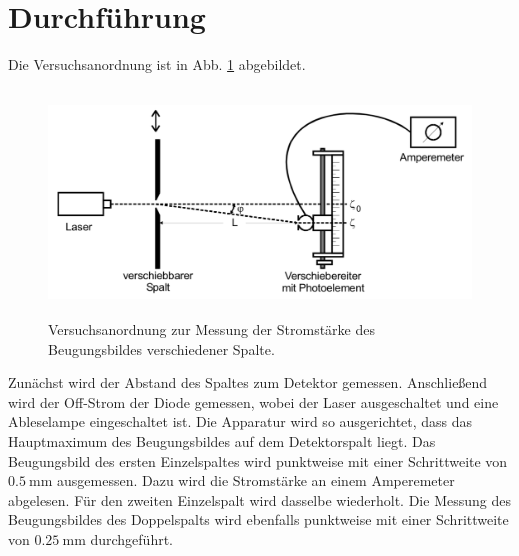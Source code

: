 \section{Durchführung}
\label{sec:Durchführung}
Die Versuchsanordnung ist in Abb. \ref{fig:Anordnung} abgebildet.
\begin{figure}
    \centering
    \includegraphics[width=12cm, height=6cm]{build/Anordnung.png}
    \caption{Versuchsanordnung zur Messung der Stromstärke des
    Beugungsbildes verschiedener Spalte. \cite{V406}}
    \label{fig:Anordnung}
\end{figure}

\noindent Zunächst wird der Abstand des Spaltes zum Detektor gemessen.
Anschließend wird der Off-Strom der Diode gemessen, wobei
der Laser ausgeschaltet und eine Ableselampe eingeschaltet ist.
\newline
Die Apparatur wird so ausgerichtet, dass das Hauptmaximum des 
Beugungsbildes auf dem Detektorspalt liegt.
\newline
Das Beugungsbild des ersten Einzelspaltes wird punktweise
mit einer Schrittweite von $\SI{0.5}{\milli\meter}$ ausgemessen.
Dazu wird die Stromstärke an einem Amperemeter abgelesen.
\newline
Für den zweiten Einzelspalt wird dasselbe wiederholt.
\newline
Die Messung des Beugungsbildes des Doppelspalts wird ebenfalls
punktweise mit einer Schrittweite von $\SI{0.25}{\milli\meter}$ 
durchgeführt.